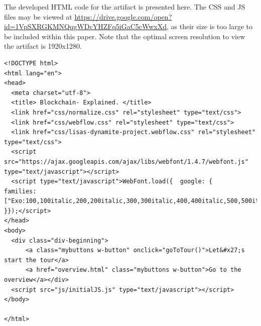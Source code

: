 \pagebreak

 \label{anhang:CodeArtifact}
The developed \ac{HTML} code for the artifact is presented here. The \ac{CSS} and \ac{JS} files may be viewed at \href{https://drive.google.com/open?id=1VpSXRGKMNQqgWDcYHZFq5iGaC5cWwxXd}{https://drive.google.com/open?id=1VpSXRGKMNQqgWDcYHZFq5iGaC5cWwxXd}, as their size is too large to be included within this paper. Note that the optimal screen resolution to view the artifact is 1920x1280.

\lstset{
language=HTML,
breaklines=true,
basicstyle=\scriptsize,
stepnumber=2,
}

\begin{lstlisting}
<!DOCTYPE html>
<html lang="en">
<head>
  <meta charset="utf-8">
  <title> Blockchain- Explained. </title>
  <link href="css/normalize.css" rel="stylesheet" type="text/css">
  <link href="css/webflow.css" rel="stylesheet" type="text/css">
  <link href="css/lisas-dynamite-project.webflow.css" rel="stylesheet" type="text/css">
  <script src="https://ajax.googleapis.com/ajax/libs/webfont/1.4.7/webfont.js" type="text/javascript"></script>
  <script type="text/javascript">WebFont.load({  google: {    families: ["Exo:100,100italic,200,200italic,300,300italic,400,400italic,500,500italic,600,600italic,700,700italic,800,800italic,900,900italic","Roboto:100,100italic,300,300italic,regular,italic,500,500italic,700,700italic,900,900italic"]  }});</script>
</head>
<body>
  <div class="div-beginning">
      <a class="mybuttons w-button" onclick="goToTour()">Let&#x27;s start the tour</a>
      <a href="overview.html" class="mybuttons w-button">Go to the overview</a></div>
  <script src="js/initialJS.js" type="text/javascript"></script>
</body>

</html>
\end{lstlisting}

